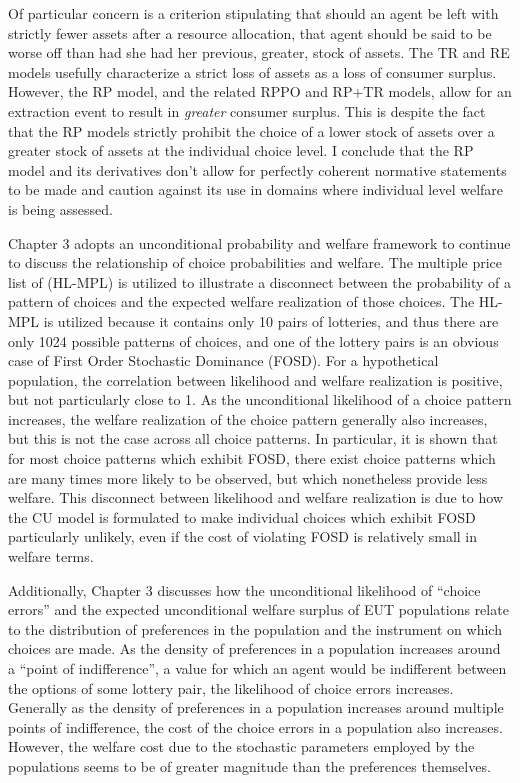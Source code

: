 \documentclass[../main.tex]{subfiles}
\begin{document}
Of particular concern is a criterion stipulating that should an agent be left with strictly fewer assets after a resource allocation, that agent should be said to be worse off than had she had her previous, greater, stock of assets.
The TR and RE models usefully characterize a strict loss of assets as a loss of consumer surplus.
However, the RP model, and the related RPPO and RP+TR models, allow for an extraction event to result in \textit{greater} consumer surplus.
This is despite the fact that the RP models strictly prohibit the choice of a lower stock of assets over a greater stock of assets at the individual choice level.
I conclude that the RP model and its derivatives don't allow for perfectly coherent normative statements to be made and caution against its use in domains where individual level welfare is being assessed.

Chapter 3 adopts an unconditional probability and welfare framework to continue to discuss the relationship of choice probabilities and welfare.
The multiple price list of \textcite{Holt2002} (HL-MPL) is utilized to illustrate a disconnect between the probability of a pattern of choices and the expected welfare realization of those choices.
The HL-MPL is utilized because it contains only 10 pairs of lotteries, and thus there are only 1024 possible patterns of choices, and one of the lottery pairs is an obvious case of First Order Stochastic Dominance (FOSD).
For a hypothetical population, the correlation between likelihood and welfare realization is positive, but not particularly close to 1.
As the unconditional likelihood of a choice pattern increases, the welfare realization of the choice pattern generally also increases, but this is not the case across all choice patterns.
In particular, it is shown that for most choice patterns which exhibit FOSD, there exist choice patterns which are many times more likely to be observed, but which nonetheless provide less welfare.
This disconnect between likelihood and welfare realization is due to how the CU model is formulated to make individual choices which exhibit FOSD particularly unlikely, even if the cost of violating FOSD is relatively small in welfare terms.

Additionally, Chapter 3 discusses how the unconditional likelihood of \enquote{choice errors} and the expected unconditional welfare surplus of EUT populations relate to the distribution of preferences in the population and the instrument on which choices are made.
As the density of preferences in a population increases around a \enquote{point of indifference}, a value for which an agent would be indifferent between the options of some lottery pair, the likelihood of choice errors increases.
Generally as the density of preferences in a population increases around multiple points of indifference, the cost of the choice errors in a population also increases.
However, the welfare cost due to the stochastic parameters employed by the populations seems to be of greater magnitude than the preferences themselves.
\end{document}
